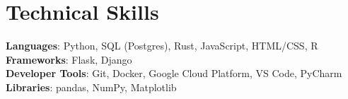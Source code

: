 \documentclass[letterpaper,11pt]{article}
\begin{document}
%
\section{Technical Skills}
 \begin{itemize}[leftmargin=0.15in, label={}]
    \small{\item{
     \textbf{Languages}{: Python, SQL (Postgres), Rust, JavaScript, HTML/CSS, R} \\
     \textbf{Frameworks}{: Flask, Django} \\
     \textbf{Developer Tools}{: Git, Docker, Google Cloud Platform, VS Code, PyCharm} \\
     \textbf{Libraries}{: pandas, NumPy, Matplotlib}
    }}
 \end{itemize}


\end{document}
